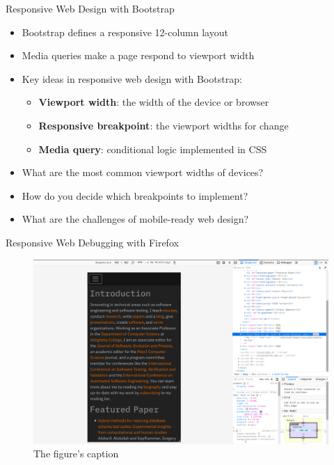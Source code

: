 \documentclass[14pt,aspectratio=169]{beamer}
\begin{document}
%
\begin{frame}{Responsive Web Design with Bootstrap}
  \begin{itemize}
    \item Bootstrap defines a responsive 12-column layout
      \vspace*{-.15in}
    \item Media queries make a page respond to viewport width
      \vspace*{-.15in}
    \item Key ideas in responsive web design with Bootstrap:
      \begin{itemize}
        \item {\bf Viewport width}: the width of the device or browser
        \item {\bf Responsive breakpoint}: the viewport widths for change
        \item {\bf Media query}: conditional logic implemented in CSS
      \end{itemize}
      \vspace*{-.2in}
    \item What are the most common viewport widths of devices?
      \vspace*{-.2in}
    \item How do you decide which breakpoints to implement?
      \vspace*{-.2in}
    \item What are the challenges of mobile-ready web design?
  \end{itemize}
\end{frame}

%
\begin{frame}{Responsive Web Debugging with Firefox}
  \begin{figure}
    \centering
    \includegraphics[scale=.085]{images/responsive-mode-firefox.png}
    \caption{The figure's caption}
  \end{figure}
\end{frame}
\end{document}
